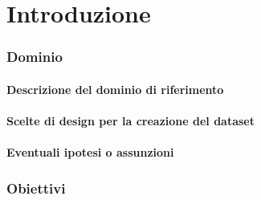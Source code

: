 \part{Introduzione}
\label{part:introduzione}

\section{Dominio}
\subsection{Descrizione del dominio di riferimento}
\subsection{Scelte di design per la creazione del dataset}
\subsection{Eventuali ipotesi o assunzioni}
\section{Obiettivi}
